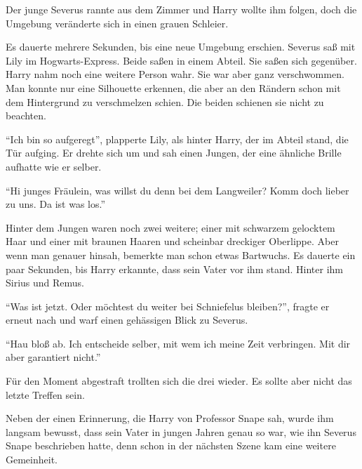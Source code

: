 \begin{traum}
Der junge Severus rannte aus dem Zimmer und Harry wollte ihm folgen, doch die Umgebung veränderte sich in einen grauen Schleier.

Es dauerte mehrere Sekunden, bis eine neue Umgebung erschien. Severus saß mit Lily im Hogwarts-Express. Beide saßen in einem Abteil. Sie saßen sich gegenüber. Harry nahm noch eine weitere Person wahr. Sie war aber ganz verschwommen. Man konnte nur eine Silhouette erkennen, die aber an den Rändern schon mit dem Hintergrund zu verschmelzen schien. Die beiden schienen sie nicht zu beachten.

\enquote{Ich bin so aufgeregt}, plapperte Lily, als hinter Harry, der im Abteil stand, die Tür aufging. Er drehte sich um und sah einen Jungen, der eine ähnliche Brille aufhatte wie er selber.

\enquote{Hi junges Fräulein, was willst du denn bei dem Langweiler? Komm doch lieber zu uns. Da ist was los.}

Hinter dem Jungen waren noch zwei weitere; einer mit schwarzem gelocktem Haar und einer mit braunen Haaren und scheinbar dreckiger Oberlippe. Aber wenn man genauer hinsah, bemerkte man schon etwas Bartwuchs. Es dauerte ein paar Sekunden, bis Harry erkannte, dass sein Vater vor ihm stand. Hinter ihm Sirius und Remus.

\enquote{Was ist jetzt. Oder möchtest du weiter bei Schniefelus bleiben?}, fragte er erneut nach und warf einen gehässigen Blick zu Severus.

\enquote{Hau bloß ab. Ich entscheide selber, mit wem ich meine Zeit verbringen. Mit dir aber garantiert nicht.}

Für den Moment abgestraft trollten sich die drei wieder. Es sollte aber nicht das letzte Treffen sein.
\end{traum}

Neben der einen Erinnerung, die Harry von Professor Snape sah, wurde ihm langsam bewusst, dass sein Vater in jungen Jahren genau so war, wie ihn Severus Snape beschrieben hatte, denn schon in der nächsten Szene kam eine weitere Gemeinheit.

